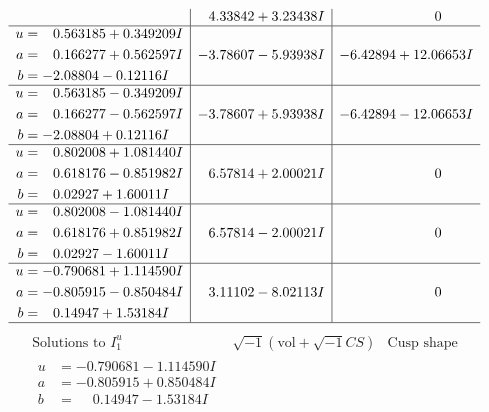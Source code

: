 \documentclass[1p]{elsarticle_modified}
\theoremstyle{definition}
\newcommand{\I}{\sqrt{-1}}
\begin{document}
$$\begin{array}{c|c|c}
 & \phantom{-}4.33842 + 3.23438 I & \phantom{-0.000000 } 0 \\ \hline\begin{aligned}
u &= \phantom{-}0.563185 + 0.349209 I \\
a &= \phantom{-}0.166277 + 0.562597 I \\
b &= -2.08804 - 0.12116 I\end{aligned}
 & -3.78607 - 5.93938 I & -6.42894 + 12.06653 I \\ \hline\begin{aligned}
u &= \phantom{-}0.563185 - 0.349209 I \\
a &= \phantom{-}0.166277 - 0.562597 I \\
b &= -2.08804 + 0.12116 I\end{aligned}
 & -3.78607 + 5.93938 I & -6.42894 - 12.06653 I \\ \hline\begin{aligned}
u &= \phantom{-}0.802008 + 1.081440 I \\
a &= \phantom{-}0.618176 - 0.851982 I \\
b &= \phantom{-}0.02927 + 1.60011 I\end{aligned}
 & \phantom{-}6.57814 + 2.00021 I & \phantom{-0.000000 } 0 \\ \hline\begin{aligned}
u &= \phantom{-}0.802008 - 1.081440 I \\
a &= \phantom{-}0.618176 + 0.851982 I \\
b &= \phantom{-}0.02927 - 1.60011 I\end{aligned}
 & \phantom{-}6.57814 - 2.00021 I & \phantom{-0.000000 } 0 \\ \hline\begin{aligned}
u &= -0.790681 + 1.114590 I \\
a &= -0.805915 - 0.850484 I \\
b &= \phantom{-}0.14947 + 1.53184 I\end{aligned}
 & \phantom{-}3.11102 - 8.02113 I & \phantom{-0.000000 } 0\\
 \hline 
 \end{array}$$\newpage$$\begin{array}{c|c|c}  
\text{Solutions to }I^u_{1}& \I (\text{vol} + \sqrt{-1}CS) & \text{Cusp shape}\\
 \hline 
\begin{aligned}
u &= -0.790681 - 1.114590 I \\
a &= -0.805915 + 0.850484 I \\
b &= \phantom{-}0.14947 - 1.53184 I\end{aligned}

\end{array}$$
\end{document}
